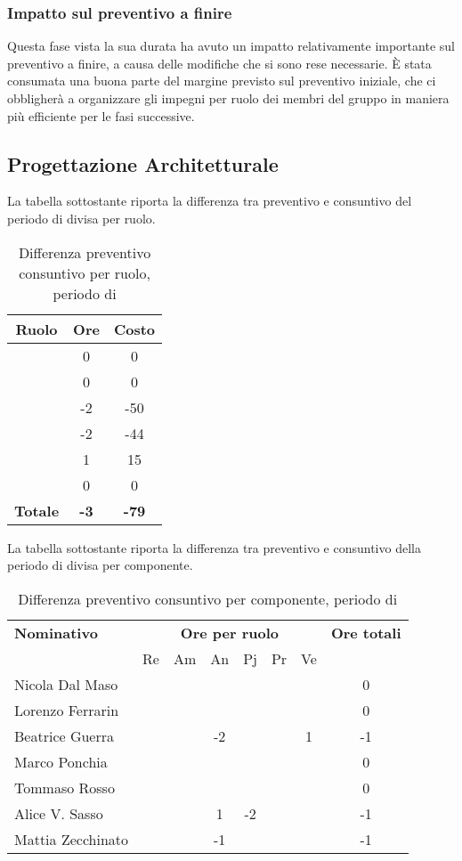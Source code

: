 \subsubsection{Impatto sul preventivo a finire}
Questa fase vista la sua durata ha avuto un impatto relativamente importante sul preventivo a finire, a causa delle modifiche che si sono rese necessarie.
È stata consumata una buona parte del margine previsto sul preventivo iniziale, che ci obbligherà a organizzare gli impegni per ruolo dei membri del gruppo in maniera più efficiente per le fasi successive.

\subsection{Progettazione Architetturale}
La tabella sottostante riporta la differenza tra preventivo e consuntivo del periodo di \PA{} divisa per ruolo.
\begin{table}[H]
	\centering
	\begin{tabular}{|c|c|c|}
		\hline
		\textbf{Ruolo} &
		\textbf{Ore} &
		\textbf{Costo} \\
		\hline
		\Responsabile & 0 & 0\\
		\hline
		\Amministratore & 0 & 0\\
		\hline
		\Analista & -2 & -50\\
		\hline
		\Progettista & -2 & -44 \\
		\hline
		\Verificatore & 1 & 15 \\
		\hline
		\Programmatore & 0 & 0 \\
		\hline
		\textbf{Totale} & \textbf{-3} & \textbf{-79} \\
		\hline
	\end{tabular}
	\caption{Differenza preventivo consuntivo per ruolo, periodo di \PA}
\end{table}

La tabella sottostante riporta la differenza tra preventivo e consuntivo della periodo di \PA{} divisa per componente.
\begin{table}[H]
	\centering
	\begin{tabular}{|l|c|c|c|c|c|c|c|}
		\hline
		\textbf{Nominativo} & 
		\multicolumn{6}{c|}{\textbf{Ore per ruolo}} & 
		\textbf{Ore totali} \\
		& Re & Am & An & Pj & Pr & Ve & \\
		\hline
		Nicola Dal Maso & & & & & & & 0 \\
		Lorenzo Ferrarin & & & & & & & 0 \\
		Beatrice Guerra & & & -2& & & 1& -1 \\
		Marco Ponchia & & & & & & & 0 \\
		Tommaso Rosso & & & & & & & 0 \\
		Alice V. Sasso & & & 1& -2& & & -1 \\
		Mattia Zecchinato & & & -1& & & & -1 \\
		\hline
	\end{tabular}
	\caption{Differenza preventivo consuntivo per componente, periodo di \PA}
\end{table}
